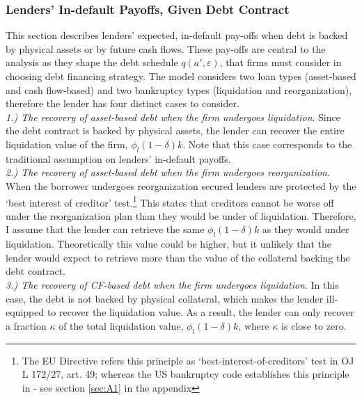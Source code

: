 \documentclass[12pt]{article}
\begin{document}
\subsubsection{Lenders' In-default Payoffs, Given Debt Contract}   \label{sec:Default Resolution}
This section describes lenders' expected, in-default pay-offs when debt is backed by physical assets or by future cash flows. These pay-offs are central to the analysis as they shape the debt schedule $q(a', \varepsilon)$, that firms must consider in choosing debt financing strategy. The model considers two loan types (asset-based and cash flow-based) and two bankruptcy types (liquidation and reorganization), therefore the lender has four distinct cases to consider. \vspace{3mm} \\
\textit{ 1.) The recovery of asset-based debt when the firm undergoes liquidation}. Since the debt contract is backed by physical assets, the lender can recover the entire liquidation value of the firm, $\phi_l(1-\delta)k$. Note that this case corresponds to the traditional assumption on lenders' in-default payoffs.  \vspace{3mm} \\
\textit{ 2.) The recovery of asset-based debt when the firm undergoes reorganization}. When the borrower undergoes reorganization secured lenders are protected by the ‘best interest of creditor’ test.\footnote{The EU Directive refers this principle as ‘best-interest-of-creditors’ test in OJ L 172/27, art. 49; whereas the US bankruptcy code establishes this principle in - see section \ref{sec:A1} in the appendix} This states that creditors cannot be worse off under the reorganization plan than they would be under of liquidation. Therefore, I assume that the lender can retrieve the same $\phi_l(1-\delta)k$ as they would under liquidation. Theoretically this value could be higher, but it unlikely that the lender would expect to retrieve more than the value of the collateral backing the debt contract. \vspace{3mm} \\
\textit{ 3.) The recovery of CF-based debt when the firm undergoes liquidation}. In this case, the debt is not backed by physical collateral, which makes the lender ill-equipped to recover the liquidation value.  As a result, the lender can only recover a fraction $\kappa$ of the total liquidation value, $\phi_l(1-\delta)k$, where $\kappa$ is close to zero. \vspace{3mm} \\
\end{document}
